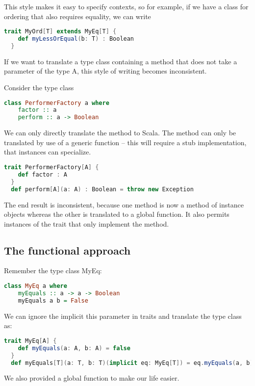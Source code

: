 This style makes it easy to specify contexts, so for example, if we have
a class  for ordering that also requires equality, we can write
\begin{lstlisting}[language=Scala,gobble=6]
  trait MyOrd[T] extends MyEq[T] {
    def myLessOrEqual(b: T) : Boolean
  }
\end{lstlisting}

If we want to translate a type class containing a method that does not take a
parameter of the type A, this style of writing becomes inconsistent.

\ex Consider the type class
\begin{lstlisting}[language=Haskell,gobble=6]
  class PerformerFactory a where
    factor :: a
    perform :: a -> Boolean
\end{lstlisting}
We can only directly translate the  method to Scala. The 
method can only be translated by use of a generic function -- this will
require a stub implementation, that instances can specialize.
\begin{lstlisting}[language=Scala,gobble=6]
  trait PerformerFactory[A] {
    def factor : A
  }
  def perform[A](a: A) : Boolean = throw new Exception
\end{lstlisting}
The end result is inconsistent, because one method is now a method of
instance objects whereas the other is translated to a global function. It
also permits instances of the trait that only implement the 
method.
\subsection{The functional approach}
Remember the type class MyEq:
\begin{lstlisting}[language=Haskell,gobble=6]
  class MyEq a where
    myEquals :: a -> a -> Boolean
    myEquals a b = False
\end{lstlisting}
We can ignore the implicit this parameter in traits and translate the type
class as:
\begin{lstlisting}[language=Scala,gobble=6]
  trait MyEq[A] {
    def myEquals(a: A, b: A) = false
  }
  def myEquals[T](a: T, b: T)(implicit eq: MyEq[T]) = eq.myEquals(a, b)
\end{lstlisting}
We also provided a global  function to make our life easier.


